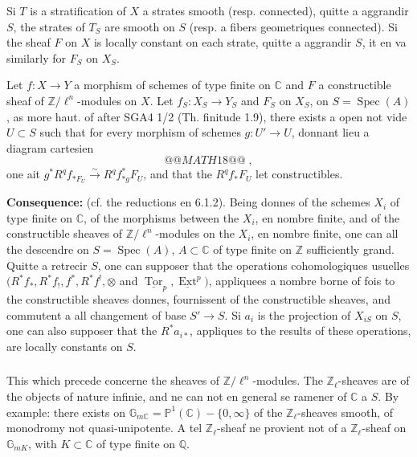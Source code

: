 \documentclass[12pt,a4paper]{article}
\theoremstyle{plain}
\theoremstyle{definition}
\theoremstyle{remark}
\DeclareMathOperator{\Ext}{Ext}
\DeclareMathOperator{\Spec}{Spec}
\DeclareMathOperator{\Tor}{Tor}
\newcommand{\CC}{\mathbb{C}}
\newcommand{\GG}{\mathbb{G}}
\newcommand{\PP}{\mathbb{P}}
\newcommand{\QQ}{\mathbb{Q}}
\newcommand{\ZZ}{\mathbb{Z}}
\begin{document}
Si $T$ is a stratification of $X$ a strates smooth (resp. connected), quitte a aggrandir $S$, the strates of $T_S$ are smooth on $S$ (resp. a fibers geometriques connected). Si the sheaf $F$ on $X$ is locally constant on each strate, quitte a aggrandir $S$, it en va similarly for $F_S$ on $X_S$.

Let $f: X \longrightarrow Y$ a morphism of schemes of type finite on $\CC$ and $F$ a constructible sheaf of $\ZZ/\ell^n$-modules on $X$. Let $f_S: X_S \to Y_S$ and $F_S$ on $X_S$, on $S = \Spec(A)$, as more haut. of after SGA4 1/2 (Th. finitude 1.9), there exists a open not vide $U \subset S$ such that for every morphism of schemes $g: U' \to U$, donnant lieu a diagram cartesien
\[
@@MATH18@@\;,
\]
one ait $g^*R^qf_{*F_U} \xrightarrow{\sim} R^qf_{*g}^*F_U$, and that the $R^qf_*F_U$ let constructibles.

\medskip
\noindent\textbf{Consequence:} (cf. the reductions en 6.1.2). Being donnes of the schemes $X_i$ of type finite on $\CC$, of the morphisms between the $X_i$, en nombre finite, and of the constructible sheaves of $\ZZ/\ell^n$-modules on the $X_i$, en nombre finite, one can all the descendre on $S = \Spec(A)$, $A \subset \CC$ of type finite on $\ZZ$ sufficiently grand. Quitte a retrecir $S$, one can supposer that the operations cohomologiques usuelles $(R^*f_*, R^*f_!, f^*, R^*f^!, \otimes$ and $\underline{\Tor}_p, \underline{\Ext}^p)$, appliquees a nombre borne of fois to the constructible sheaves donnes, fournissent of the constructible sheaves, and commutent a all changement of base $S' \to S$. Si $a_i$ is the projection of $X_{iS}$ on $S$, one can also supposer that the $R^*a_{i*}$, appliques to the results of these operations, are locally constants on $S$.

\subsubsection{}
This which precede concerne the sheaves of $\ZZ/\ell^n$-modules. The $\ZZ_{\ell}$-sheaves are of the objects of nature infinie, and ne can not en general se ramener of $\CC$ a $S$. By example: there exists on $\GG_{m\CC} = \PP^1(\CC) - \{0, \infty\}$ of the $\ZZ_{\ell}$-sheaves smooth, of monodromy not quasi-unipotente. A tel $\ZZ_{\ell}$-sheaf ne provient not of a $\ZZ_{\ell}$-sheaf on $\GG_{mK}$, with $K \subset \CC$ of type finite on $\QQ$.
\end{document}

